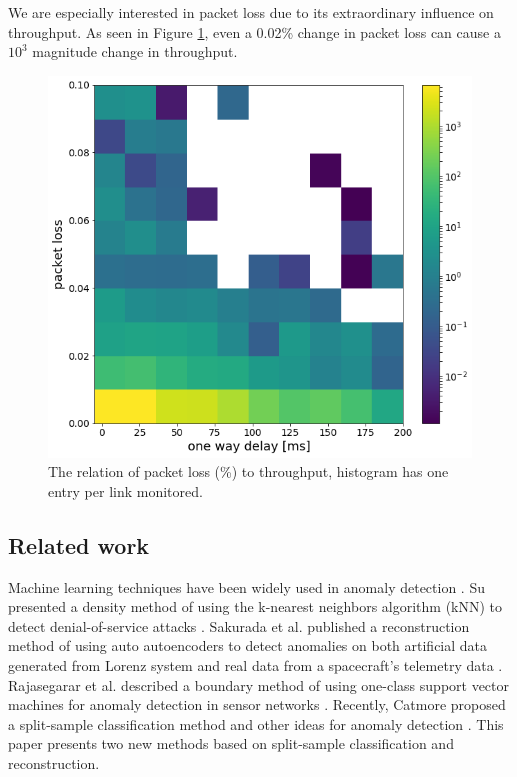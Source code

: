 \documentclass[5p]{elsarticle}
\begin{document}
We are especially interested in packet loss due to its extraordinary influence on throughput. As seen in Figure \ref{fig:PL}, even a 0.02\% change in packet loss can cause a $10^3$ magnitude change in throughput.

\begin{figure}[htbp]
    \centering
    \includegraphics[width=\linewidth]{PL.png}
    \caption{The relation of packet loss (\%) to throughput, histogram has one entry per link monitored.}
    \label{fig:PL}
\end{figure}


\subsection{Related work}

Machine learning techniques have been widely used in anomaly detection \cite{dva}. Su presented a density method of using the k-nearest neighbors algorithm (kNN) to detect denial-of-service attacks \cite{tri}. Sakurada et al. published a reconstruction method of using auto autoencoders to detect anomalies on both artificial data generated from Lorenz system and real data from a spacecraft’s telemetry data \cite{cetiri}. Rajasegarar et al. described a boundary method of using one-class support vector machines for anomaly detection in sensor networks \cite{pet}. Recently, Catmore proposed a split-sample classification method and other ideas for anomaly detection \cite{sest}. This paper presents two new methods based on split-sample classification and reconstruction.
\end{document}
